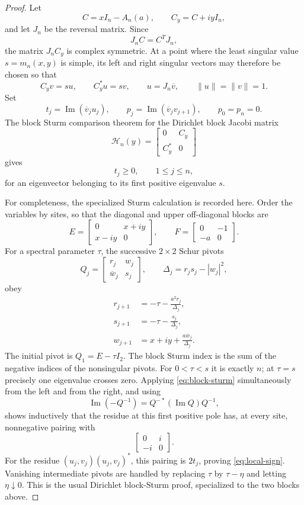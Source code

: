 \documentclass[11pt]{article}
\begin{document}
\begin{proof}
Let
\[
C=xI_n-A_n(a),\qquad C_y=C+iyI_n,
\]
and let \(J_n\) be the reversal matrix. Since
\[
J_nC=C^TJ_n,
\]
the matrix \(J_nC_y\) is complex symmetric. At a point where the least singular
value \(s=m_n(x,y)\) is simple, its left and right singular vectors may therefore
be chosen so that
\[
C_yv=su,\qquad C_y^*u=sv,\qquad u=J_n\overline v,
\qquad \|u\|=\|v\|=1.
\]
Set
\[
t_j=\operatorname{Im}(\overline v_j u_j),
\qquad
p_j=\operatorname{Im}(\overline v_jv_{j+1}),
\qquad p_0=p_n=0.
\]
The block Sturm comparison theorem for the Dirichlet block Jacobi matrix
\[
\mathcal H_n(y)=
\begin{bmatrix}
0&C_y\\
C_y^*&0
\end{bmatrix}
\]
gives
\[
t_j\geq0,\qquad 1\leq j\leq n,
\tag{3}\label{eq:local-sign}
\]
for an eigenvector belonging to its first positive eigenvalue \(s\).

For completeness, the specialized Sturm calculation is recorded here.  Order
the variables by sites, so that the diagonal and upper off-diagonal blocks are
\[
E=
\begin{bmatrix}
0&x+iy\\
x-iy&0
\end{bmatrix},
\qquad
F=
\begin{bmatrix}
0&-1\\
-a&0
\end{bmatrix}.
\]
For a spectral parameter \(\tau\), the successive \(2\times2\) Schur pivots
\[
Q_j=
\begin{bmatrix}
r_j&w_j\\
\overline w_j&s_j
\end{bmatrix},
\qquad
\Delta_j=r_js_j-|w_j|^2,
\]
obey
\[
\begin{aligned}
r_{j+1}&=-\tau-\frac{a^2r_j}{\Delta_j},\\
s_{j+1}&=-\tau-\frac{s_j}{\Delta_j},\\
w_{j+1}&=x+iy+\frac{a\overline w_j}{\Delta_j}.
\end{aligned}
\tag{4}\label{eq:block-sturm}
\]
The initial pivot is \(Q_1=E-\tau I_2\).  The block Sturm index is the sum of
the negative indices of the nonsingular pivots.  For \(0<\tau<s\) it is exactly
\(n\); at \(\tau=s\) precisely one eigenvalue crosses zero.  Applying
\eqref{eq:block-sturm} simultaneously from the left and from the right, and
using
\[
\operatorname{Im}(-Q^{-1})
=
Q^{-*}(\operatorname{Im}Q)Q^{-1},
\]
shows inductively that the residue at this first positive pole has, at every
site, nonnegative pairing with
\[
\begin{bmatrix}0&i\\-i&0\end{bmatrix}.
\]
For the residue \((u_j,v_j)(u_j,v_j)^*\), this pairing is \(2t_j\), proving
\eqref{eq:local-sign}.  Vanishing intermediate pivots are handled by replacing
\(\tau\) by \(\tau-\eta\) and letting \(\eta\downarrow0\).  This is the usual
Dirichlet block-Sturm proof, specialized to the two blocks above.


\end{proof}
\end{document}
